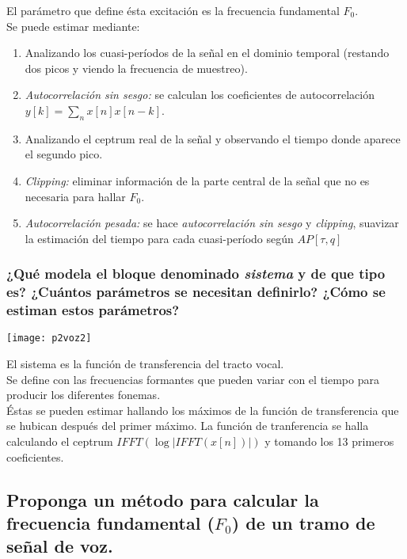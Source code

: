 \documentclass[a4paper,10pt,spanish,oneside]{article}
\begin{document}
El parámetro que define ésta excitación es la frecuencia fundamental $F_{0}$.\\

Se puede estimar mediante:

\begin{enumerate}[1.]
\item Analizando los cuasi-períodos de la señal en el dominio temporal (restando dos picos y viendo la frecuencia de muestreo).

\item \textit{Autocorrelación sin sesgo:} se calculan los coeficientes de autocorrelación $\displaystyle y[k]=\sum_{n}x[n]x[n-k]$.

\item Analizando el ceptrum real de la señal y observando el tiempo donde aparece el segundo pico.

\item \textit{Clipping:} eliminar información de la parte central de la señal que no es necesaria para hallar $F_{0}$.

\item \textit{Autocorrelación pesada:} se hace \textit{autocorrelación sin sesgo} y \textit{clipping}, suavizar la estimación del tiempo para cada cuasi-período según $AP[\tau,q]$
\end{enumerate}
	
\subsubsection{¿Qué modela el bloque denominado \textit{sistema} y de que tipo es? ¿Cuántos 	parámetros se necesitan definirlo? ¿Cómo se estiman estos parámetros?}

\begin{center}
\texttt{[image: p2voz2]}
\end{center}

El sistema es la función de transferencia del tracto vocal.\\

Se define con las frecuencias formantes que pueden variar con el tiempo para producir los diferentes fonemas.\\

Éstas se pueden estimar hallando los máximos de la función de transferencia que se hubican después del primer máximo. La función de tranferencia se halla calculando el ceptrum $IFFT(\log|IFFT(x[n])|)$ y tomando los 13 primeros coeficientes.

\subsection{Proponga un método para calcular la frecuencia fundamental ($F_{0}$) de un tramo de señal de voz.}
\end{document}
